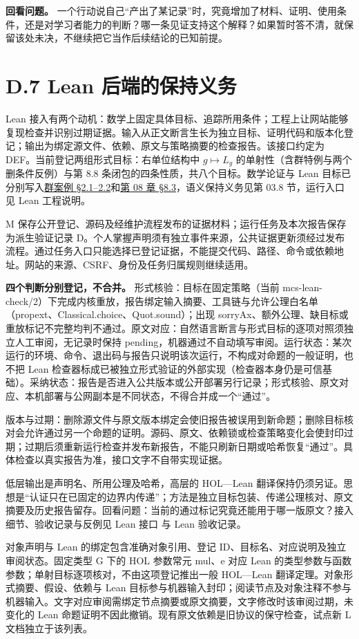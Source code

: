 \documentclass[UTF8,a4paper,zihao=-4,fontset=windows,openany]{ctexbook}
\begin{document}
\textbf{回看问题。} 一个行动说自己“产出了某记录”时，究竟增加了材料、证明、使用条件，还是对学习者能力的判断？哪一条见证支持这个解释？如果暂时答不清，就保留该处未决，不继续把它当作后续结论的已知前提。

\section{D.7 Lean 后端的保持义务}
Lean 接入有两个动机：数学上固定具体目标、追踪所用条件；工程上让网站能够复现检查并识别过期证据。输入从正文断言生长为独立目标、证明代码和版本化登记；输出为绑定源文件、依赖、原文与策略摘要的检查报告。该接口约定为 DEF。当前登记两组形式目标：右单位结构中 \(g\mapsto L_g\) 的单射性（含群特例与两个删条件反例）与第 8.8 条闭包的四条性质，共八个目标。数学论证与 Lean 目标已分别写入\hyperref[mcs-source-19]{群案例 §2.1–2.2}和\hyperref[mcs-source-10]{第 08 章 §8.3}，语义保持义务见第 03.8 节，运行入口见 Lean 工程说明。

M 保存公开登记、源码及经维护流程发布的证据材料；运行任务及本次报告保存为派生验证记录 D。个人掌握声明须有独立事件来源，公共证据更新须经过发布流程。通过任务入口只能选择已登记证据，不能提交代码、路径、命令或依赖地址。网站的来源、CSRF、身份及任务归属规则继续适用。

\textbf{四个判断分别登记，不合并。} 形式核验：目标在固定策略（当前 mcs-lean-check/2）下完成内核重放，报告绑定输入摘要、工具链与允许公理白名单（propext、Classical.choice、Quot.sound）；出现 sorryAx、额外公理、缺目标或重放标记不完整均判不通过。原文对应：自然语言断言与形式目标的逐项对照须独立人工审阅，无记录时保持 pending，机器通过不自动填写审阅。运行状态：某次运行的环境、命令、退出码与报告只说明该次运行，不构成对命题的一般证明，也不把 Lean 检查器标成已被独立形式验证的外部实现（检查器本身仍是可信基础）。采纳状态：报告是否进入公共版本或公开部署另行记录；形式核验、原文对应、本机部署与公网副本是不同状态，不得合并成一个“通过”。

版本与过期：删除源文件与原文版本绑定会使旧报告被误用到新命题；删除目标核对会允许通过另一个命题的证明。源码、原文、依赖锁或检查策略变化会使封印过期；过期后须重新运行检查并发布新报告，不能只刷新日期或哈希恢复“通过”。具体检查以真实报告为准，接口文字不自带实现证据。

低层输出是声明名、所用公理及哈希，高层的 HOL—Lean 翻译保持仍须另证。思想是“认证只在已固定的边界内传递”；方法是独立目标包装、传递公理核对、原文摘要及历史报告留存。回看问题：当前的通过标记究竟还能用于哪一版原文？接入细节、验收记录与反例见 Lean 接口 与 Lean 验收记录。

对象声明与 Lean 的绑定包含准确对象引用、登记 ID、目标名、对应说明及独立审阅状态。固定类型 G 下的 HOL 参数常元 mul、e 对应 Lean 的类型参数与函数参数；单射目标逐项核对，不由这项登记推出一般 HOL—Lean 翻译定理。对象形式摘要、假设、依赖与 Lean 目标参与机器输入封印；阅读节点及对象注释不参与机器输入。文字对应审阅需绑定节点摘要或原文摘要，文字修改时该审阅过期，未变化的 Lean 命题证明不因此撤销。现有原文依赖是旧协议的保守检查，试点新 L 文档独立于该列表。
\end{document}
